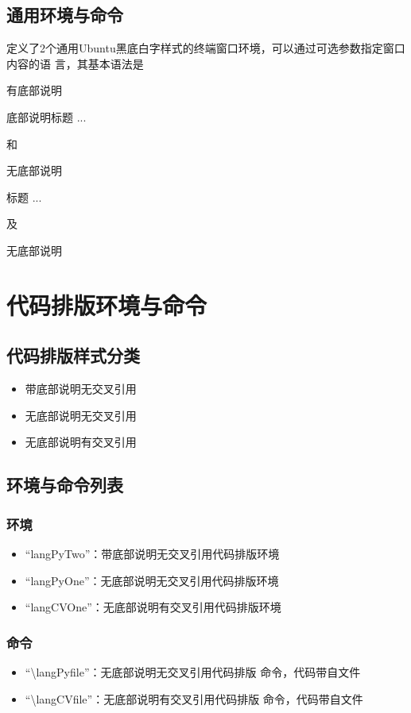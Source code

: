 \documentclass{ctexart}
\newcommand{\qtmark}[1]{``#1''}
\begin{document}
\subsection{通用环境与命令}
定义了2个通用Ubuntu黑底白字样式的终端窗口环境，可以通过可选参数指定窗口内容的语
言，其基本语法是
\begin{langPyOne}[tex]{有底部说明}
  \begin{GitExample}[代码语言]{底部说明}{标题}
     ...
  \end{GitExample} 
\end{langPyOne}
和
\begin{langPyOne}[tex]{无底部说明}
  \begin{GitExampla}[代码语言]{标题}
     ...
  \end{GitExampla} 
\end{langPyOne}
及
\begin{langPyOne}[tex]{无底部说明}
\end{langPyOne}  

\section{代码排版环境与命令}
\subsection{代码排版样式分类 }
\begin{itemize}
\item 带底部说明无交叉引用
\item 无底部说明无交叉引用
\item 无底部说明有交叉引用
\end{itemize}
\subsection{环境与命令列表}
\subsubsection{环境}
\begin{itemize}
\item \qtmark{langPyTwo}：带底部说明无交叉引用代码排版环境
\item \qtmark{langPyOne}：无底部说明无交叉引用代码排版环境
\item \qtmark{langCVOne}：无底部说明有交叉引用代码排版环境
\end{itemize}
\subsubsection{命令}
\begin{itemize}
\item \qtmark{\textbackslash langPyfile}：无底部说明无交叉引用代码排版
  命令，代码带自文件
\item \qtmark{\textbackslash langCVfile}：无底部说明有交叉引用代码排版
  命令，代码带自文件
\end{itemize}
\end{document}
